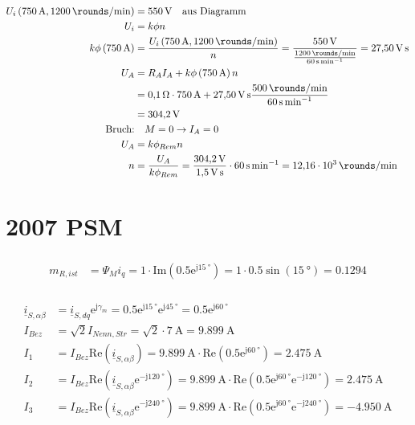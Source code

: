 \documentclass[11pt,a4paper]{scrartcl}
\newcommand{\mybr}[1]{\left(#1\right)}
\renewcommand{\j}{\mathrm{j}}
\renewcommand{\i}{\underline{i}}
\newcommand{\0}{_{\mybr{0}}}
\newcommand{\1}{_{\mybr{1}}}
\newcommand{\2}{_{\mybr{2}}}
\renewcommand{\e}{\mathrm{e}}
\renewcommand{\Re}{\mathrm{Re}}
\renewcommand{\Im}{\mathrm{Im}}
\newcommand{\isab}{\i_{S,\alpha\beta}}
\newcommand{\isdq}{\i_{S,dq}}
\begin{document}
\subsection{}
\begin{align}
U_i\mybr{\SI{750}{\ampere},\SI{1200}{\rounds\per\minute}}&=\SI{550}{\volt}\quad\text{aus Diagramm}\\
U_i&=k\phi n\\
k\phi\mybr{\SI{750}{\ampere}}&=\frac{U_i\mybr{\SI{750}{\ampere},\SI{1200}{\rounds\per\minute}}}{n}=\frac{\SI{550}{\volt}}{\frac{\SI{1200}{\rounds\per\minute}}{\SI{60}{\second\per\minute}}}=\SI{27.50}{\volt\second}\\
U_A&=R_A I_A+ k\phi\mybr{\SI{750}{\ampere}} n\\ &=\SI{0.1}{\ohm}\cdot\SI{750}{\ampere}+\SI{27.50}{\volt\second}\frac{\SI{500}{\rounds\per\minute}}{\SI{60}{\second\per\minute}}\\
&=\SI{304.2}{\volt}\\
\text{Bruch:}&\quad M=0\rightarrow I_A=0\\
U_A&=k\phi_{Rem} n\\
n&=\frac{U_A}{k\phi_{Rem}}=\frac{\SI{304.2}{\volt}}{\SI{1.5}{\volt\second}}\cdot\SI{60}{\second\per\minute}=\SI{12.16e3}{\rounds\per\minute}
\end{align}


\clearpage
\part{2007 PSM}
\section{}
\begin{align}
	m_{R,ist}&=\Psi_M i_q=1\cdot\Im\mybr{\num{0.5}\e^{\j\SI{15}{\degree}}}=1\cdot\num{0.5}\sin\mybr{\SI{15}{\degree}}=\num{0.1294}
\end{align}
\section{}
\begin{align}
	\isab&=\isdq\e^{\j\gamma_m}=\num{0.5}\e^{\j\SI{15}{\degree}}\e^{\j\SI{45}{\degree}}=\num{0.5}\e^{\j\SI{60}{\degree}}\\
	I_{Bez}&=\sqrt{2}I_{Nenn,Str}=\sqrt{2}\cdot\SI{7}{\ampere}=\SI{9.899}{\ampere}\\
	I_1&=I_{Bez}\Re\mybr{\isab}=\SI{9.899}{\ampere}\cdot\Re\mybr{\num{0.5}\e^{\j\SI{60}{\degree}}}=\SI{2.475}{\ampere}\\
	I_2&=I_{Bez}\Re\mybr{\isab\e^{-\j\SI{120}{\degree}}}=\SI{9.899}{\ampere}\cdot\Re\mybr{\num{0.5}\e^{\j\SI{60}{\degree}}\e^{-\j\SI{120}{\degree}}}=\SI{2.475}{\ampere}\\
	I_3&=I_{Bez}\Re\mybr{\isab\e^{-\j\SI{240}{\degree}}}=\SI{9.899}{\ampere}\cdot\Re\mybr{\num{0.5}\e^{\j\SI{60}{\degree}}\e^{-\j\SI{240}{\degree}}}=\SI{-4.950}{\ampere}
\end{align}
\end{document}
